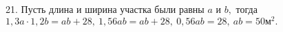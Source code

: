 21. Пусть длина и ширина участка были равны $a$ и $b,$ тогда $1,3a\cdot1,2b=ab+28,\ 1,56ab=ab+28,\ 0,56ab=28,\ ab=50\text{м}^2.$\\
